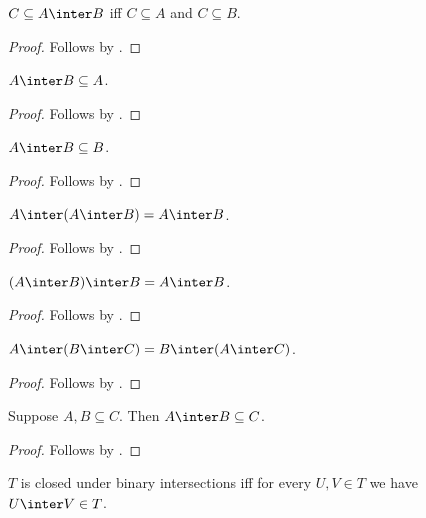 \begin{proposition}\label{subseteq_inter_iff}
    $C\subseteq A\inter B$ iff $C\subseteq A$ and $C\subseteq B$.
\end{proposition}
\begin{proof}
    Follows by .
\end{proof}

\begin{proposition}%
\label{inter_lower_left}
    $A\inter B \subseteq A$.
\end{proposition}
\begin{proof}
    Follows by .
\end{proof}

\begin{proposition}%
\label{inter_lower_right}
    $A\inter B \subseteq B$.
\end{proposition}
\begin{proof}
    Follows by .
\end{proof}

\begin{proposition}\label{inter_absorb_left}
    $A\inter (A\inter B) = A\inter B$.
\end{proposition}
\begin{proof} Follows by . \end{proof}

\begin{proposition}%
\label{inter_absorb_right}
    $(A\inter B) \inter B = A\inter B$.
\end{proposition}
\begin{proof} Follows by . \end{proof}

\begin{proposition}\label{inter_comm_left}
    $A\inter (B\inter C) = B\inter (A\inter C)$.
\end{proposition}
\begin{proof}
    Follows by .
\end{proof}

\begin{proposition}\label{inter_subseteq}
    Suppose $A,B\subseteq C$.
    Then $A\inter B\subseteq C$.
\end{proposition}
\begin{proof}
    Follows by .
\end{proof}

\begin{abbreviation}\label{closedunderinter}
    $T$ is closed under binary intersections
    iff for every $U,V\in T$ we have $U\inter V\in T$.
\end{abbreviation}

